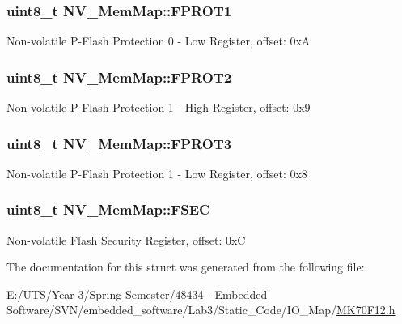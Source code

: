 \subsubsection[{F\+P\+R\+O\+T1}]{\setlength{\rightskip}{0pt plus 5cm}uint8\+\_\+t N\+V\+\_\+\+Mem\+Map\+::\+F\+P\+R\+O\+T1}\label{struct_n_v___mem_map_a87204afdff32b371c03caafdf5a07b69}
Non-\/volatile P-\/\+Flash Protection 0 -\/ Low Register, offset\+: 0x\+A \hypertarget{struct_n_v___mem_map_aace11e44cee29095fe7c0bf683039f57}{}
\subsubsection[{F\+P\+R\+O\+T2}]{\setlength{\rightskip}{0pt plus 5cm}uint8\+\_\+t N\+V\+\_\+\+Mem\+Map\+::\+F\+P\+R\+O\+T2}\label{struct_n_v___mem_map_aace11e44cee29095fe7c0bf683039f57}
Non-\/volatile P-\/\+Flash Protection 1 -\/ High Register, offset\+: 0x9 \hypertarget{struct_n_v___mem_map_a944089b14b23cff0b4f8a16e13f8b9d6}{}
\subsubsection[{F\+P\+R\+O\+T3}]{\setlength{\rightskip}{0pt plus 5cm}uint8\+\_\+t N\+V\+\_\+\+Mem\+Map\+::\+F\+P\+R\+O\+T3}\label{struct_n_v___mem_map_a944089b14b23cff0b4f8a16e13f8b9d6}
Non-\/volatile P-\/\+Flash Protection 1 -\/ Low Register, offset\+: 0x8 \hypertarget{struct_n_v___mem_map_acb89fbc884fb10887ef063d1aa892b29}{}
\subsubsection[{F\+S\+E\+C}]{\setlength{\rightskip}{0pt plus 5cm}uint8\+\_\+t N\+V\+\_\+\+Mem\+Map\+::\+F\+S\+E\+C}\label{struct_n_v___mem_map_acb89fbc884fb10887ef063d1aa892b29}
Non-\/volatile Flash Security Register, offset\+: 0x\+C 

The documentation for this struct was generated from the following file\+:\begin{DoxyCompactItemize}
\item 
E\+:/\+U\+T\+S/\+Year 3/\+Spring Semester/48434 -\/ Embedded Software/\+S\+V\+N/embedded\+\_\+software/\+Lab3/\+Static\+\_\+\+Code/\+I\+O\+\_\+\+Map/\hyperlink{_m_k70_f12_8h}{M\+K70\+F12.\+h}\end{DoxyCompactItemize}
